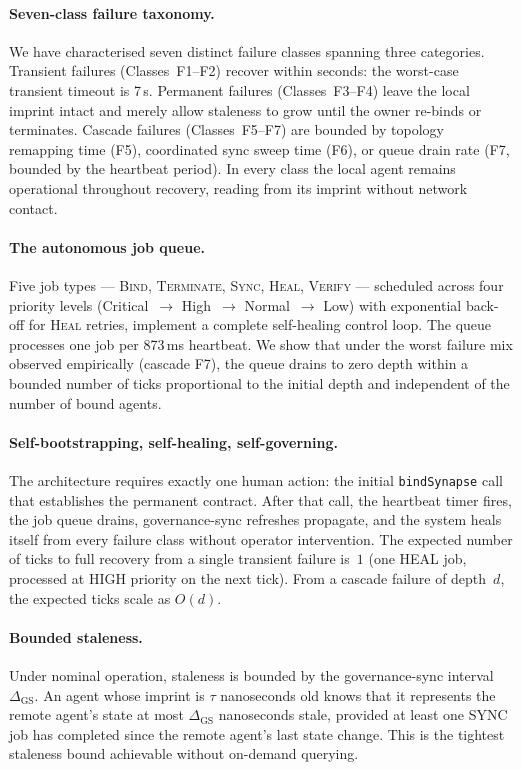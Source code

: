 \documentclass[11pt,a4paper]{article}
\newcommand{\DGS}{\Delta_{\text{GS}}}
\begin{document}
\paragraph{Seven-class failure taxonomy.}
We have characterised seven distinct failure classes spanning three categories.
Transient failures (Classes~F1--F2) recover within seconds: the worst-case
transient timeout is 7\,s.  Permanent failures (Classes~F3--F4) leave the local
imprint intact and merely allow staleness to grow until the owner re-binds or
terminates.  Cascade failures (Classes~F5--F7) are bounded by topology remapping
time (F5), coordinated sync sweep time (F6), or queue drain rate (F7,
bounded by the heartbeat period).  In every class the local agent remains
operational throughout recovery, reading from its imprint without network
contact.

\paragraph{The autonomous job queue.}
Five job types --- \textsc{Bind}, \textsc{Terminate}, \textsc{Sync},
\textsc{Heal}, \textsc{Verify} --- scheduled across four priority levels
(Critical~$\to$ High~$\to$ Normal~$\to$ Low) with exponential back-off for
\textsc{Heal} retries, implement a complete self-healing control loop.  The
queue processes one job per 873\,ms heartbeat.  We show that under the worst
failure mix observed empirically (cascade F7), the queue drains to zero depth
within a bounded number of ticks proportional to the initial depth and
independent of the number of bound agents.

\paragraph{Self-bootstrapping, self-healing, self-governing.}
The architecture requires exactly one human action: the initial
\texttt{bindSynapse} call that establishes the permanent contract.  After that
call, the heartbeat timer fires, the job queue drains, governance-sync refreshes
propagate, and the system heals itself from every failure class without operator
intervention.  The expected number of ticks to full recovery from a single
transient failure is~$1$ (one HEAL job, processed at HIGH priority on the next
tick).  From a cascade failure of depth~$d$, the expected ticks scale as
$O(d)$.

\paragraph{Bounded staleness.}
Under nominal operation, staleness is bounded by the governance-sync interval
$\DGS$.  An agent whose imprint is $\tau$ nanoseconds old knows that it
represents the remote agent's state at most $\DGS$ nanoseconds stale, provided
at least one SYNC job has completed since the remote agent's last state change.
This is the tightest staleness bound achievable without on-demand querying.
\end{document}

